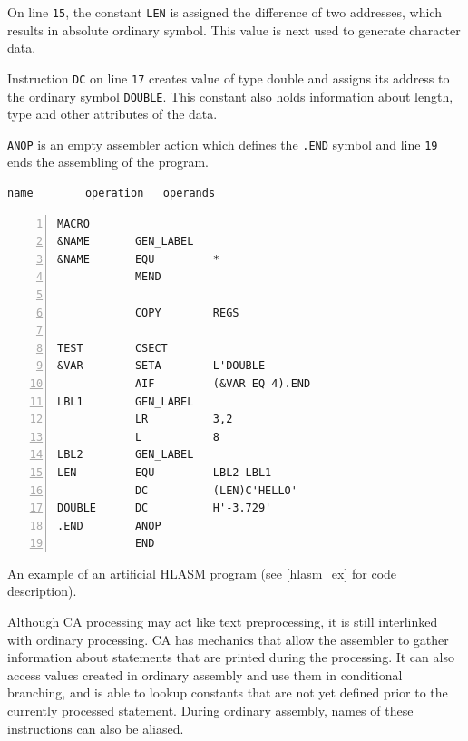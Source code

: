 On line \verb|15|, the constant \verb|LEN| is assigned the difference of two addresses, which results in absolute ordinary symbol. This value is next used to generate character data.

Instruction \verb|DC| on line \verb|17| creates value of type double and assigns its address to the ordinary symbol \verb|DOUBLE|. This constant also holds information about length, type and other attributes of the data.  

\verb|ANOP| is an empty assembler action which defines the \verb|.END| symbol and line \verb|19| ends the assembling of the program. 



\begin{listing}[t]
    \begin{verbatim}
name        operation   operands
    \end{verbatim}
	\begin{Verbatim}[numbers=left]
            MACRO                   
&NAME       GEN_LABEL
&NAME       EQU         *
            MEND
        
            COPY        REGS
        
TEST        CSECT
&VAR        SETA        L'DOUBLE
            AIF         (&VAR EQ 4).END
LBL1        GEN_LABEL
            LR          3,2
            L           8
LBL2        GEN_LABEL
LEN         EQU         LBL2-LBL1
            DC          (LEN)C'HELLO'
DOUBLE      DC          H'-3.729'
.END        ANOP
            END
	\end{Verbatim} 
	\caption{An example of an artificial HLASM program (see \cref{hlasm_ex} for code description).}
	\label{lst:example}
\end{listing}

\vspace{5mm}

Although CA processing may act like text preprocessing, it is still interlinked with ordinary processing. CA has mechanics that allow the assembler to gather information about statements that are printed during the processing. It can also access values created in ordinary assembly and use them in conditional branching, and is able to lookup constants that are not yet defined prior to the currently processed statement. During ordinary assembly, names of these instructions can also be aliased.

